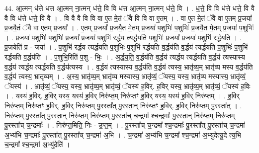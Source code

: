 \documentclass[17pt]{extarticle}
\begin{document}
44. आ॒त्मन् ध॑त्ते धत्त आ॒त्मन् ना॒त्मन् ध॑त्ते॒ वि वि ध॑त्त आ॒त्मन् ना॒त्मन् ध॑त्ते॒ वि । . ध॒त्ते॒ वि वि ध॑त्ते धत्ते॒ वि वै वै वि ध॑त्ते धत्ते॒ वि वै । . वि वै वै वि वि वा ए॒त मे॒तं ॅवै वि वि वा ए॒तम् । . वा ए॒त मे॒तं ॅवै वा ए॒तम् प्र॒जया᳚ प्र॒जयै॒तं ॅवै वा ए॒तम् प्र॒जया᳚ । . ए॒तम् प्र॒जया᳚ प्र॒जयै॒त मे॒तम् प्र॒जया॑ प॒शुभिः॑ प॒शुभिः॑ प्र॒जयै॒त मे॒तम् प्र॒जया॑ प॒शुभिः॑ । . प्र॒जया॑ प॒शुभिः॑ प॒शुभिः॑ प्र॒जया᳚ प्र॒जया॑ प॒शुभि॑ रर्द्धय त्यर्द्धयति प॒शुभिः॑ प्र॒जया᳚ प्र॒जया॑ प॒शुभि॑ रर्द्धयति । . प्र॒जयेति॑ प्र - जया᳚ । . प॒शुभि॑ रर्द्धय त्यर्द्धयति प॒शुभिः॑ प॒शुभि॑ रर्द्धयति व॒र्द्धय॑ति व॒र्द्धय॑ त्यर्द्धयति प॒शुभिः॑ प॒शुभि॑ रर्द्धयति व॒र्द्धय॑ति । . प॒शुभि॒रिति॑ प॒शु - भिः॒ । . अ॒र्द्ध॒य॒ति॒ व॒र्द्धय॑ति व॒र्द्धय॑ त्यर्द्धय त्यर्द्धयति व॒र्द्धय॑ त्यस्यास्य व॒र्द्धय॑ त्यर्द्धय त्यर्द्धयति व॒र्द्धय॑त्यस्य । . व॒र्द्धय॑ त्यस्यास्य व॒र्द्धय॑ति व॒र्द्धय॑ त्यस्य॒ भ्रातृ॑व्य॒म् भ्रातृ॑व्य मस्य व॒र्द्धय॑ति व॒र्द्धय॑ त्यस्य॒ भ्रातृ॑व्यम् । . अ॒स्य॒ भ्रातृ॑व्य॒म् भ्रातृ॑व्य मस्यास्य॒ भ्रातृ॑व्यं॒ ॅयस्य॒ यस्य॒ भ्रातृ॑व्य मस्यास्य॒ भ्रातृ॑व्यं॒ ॅयस्य॑ । . भ्रातृ॑व्यं॒ ॅयस्य॒ यस्य॒ भ्रातृ॑व्य॒म् भ्रातृ॑व्यं॒ ॅयस्य॑ ह॒विर्. ह॒विर् यस्य॒ भ्रातृ॑व्य॒म् भ्रातृ॑व्यं॒ ॅयस्य॑ ह॒विः । . यस्य॑ ह॒विर्. ह॒विर् यस्य॒ यस्य॑ ह॒विर् निरु॑प्त॒म् निरु॑प्तꣳ ह॒विर् यस्य॒ यस्य॑ ह॒विर् निरु॑प्तम् । . ह॒विर् निरु॑प्त॒म् निरु॑प्तꣳ ह॒विर्. ह॒विर् निरु॑प्तम् पु॒रस्ता᳚त् पु॒रस्ता॒न् निरु॑प्तꣳ ह॒विर्. ह॒विर् निरु॑प्तम् पु॒रस्ता᳚त् । . निरु॑प्तम् पु॒रस्ता᳚त् पु॒रस्ता॒न् निरु॑प्त॒म् निरु॑प्तम् पु॒रस्ता᳚च् च॒न्द्रमा᳚ श्च॒न्द्रमाः᳚ पु॒रस्ता॒न् निरु॑प्त॒म् निरु॑प्तम् पु॒रस्ता᳚च् च॒न्द्रमाः᳚ । . निरु॑प्त॒मिति॒ निः - उ॒प्त॒म् । . पु॒रस्ता᳚च् च॒न्द्रमा᳚ श्च॒न्द्रमाः᳚ पु॒रस्ता᳚त् पु॒रस्ता᳚च् च॒न्द्रमा॑ अ॒भ्य॑भि च॒न्द्रमाः᳚ पु॒रस्ता᳚त् पु॒रस्ता᳚च् च॒न्द्रमा॑ अ॒भि । . च॒न्द्रमा॑ अ॒भ्य॑भि च॒न्द्रमा᳚ श्च॒न्द्रमा॑ अ॒भ्यु॑देत्यु॒दे त्य॒भि च॒न्द्रमा᳚ श्च॒न्द्रमा॑ अ॒भ्यु॑देति॑ । \newline
\pagebreak
{}
\end{document}
